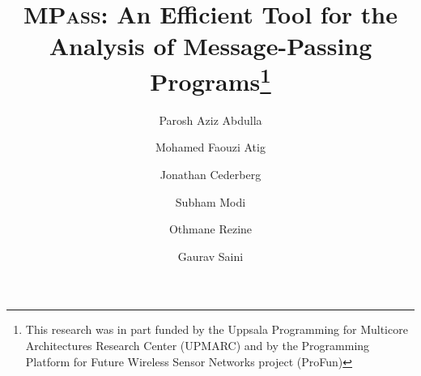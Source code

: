 \documentclass{llncs}
\newcommand{\MPass}{\textsc{MPass}}
\begin{document}
\title{\MPass:  An Efficient  Tool for the Analysis of Message-Passing Programs\thanks{This research was in part funded by the
    Uppsala Programming for Multicore Architectures Research Center
    (UPMARC)
    and by the Programming Platform for Future Wireless Sensor Networks project (ProFun)}
    }

\author{Parosh Aziz Abdulla \and Mohamed Faouzi Atig \and Jonathan Cederberg \and Subham Modi \and Othmane Rezine \and Gaurav Saini  }

\maketitle




% 


% 





\newpage
{}
{}



%
\end{document}

